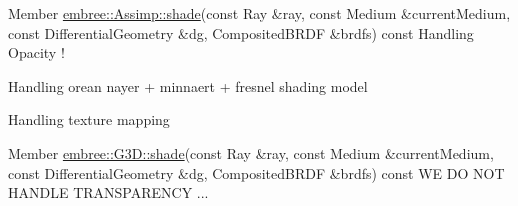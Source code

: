 \label{todo__todo000001}
\hypertarget{todo__todo000001}{}
 
\begin{DoxyDescription}
\item[Member \hyperlink{classembree_1_1_assimp_a41253494303759e35a284c5bdcb890a5}{embree::Assimp::shade}(const Ray \&ray, const Medium \&currentMedium, const DifferentialGeometry \&dg, CompositedBRDF \&brdfs) const  ]Handling Opacity ! 

Handling orean nayer + minnaert + fresnel shading model 

Handling texture mapping 
\end{DoxyDescription}

\label{todo__todo000002}
\hypertarget{todo__todo000002}{}
 
\begin{DoxyDescription}
\item[Member \hyperlink{classembree_1_1_g3_d_a03fd4021f086a07c713848a3d3d1bd97}{embree::G3D::shade}(const Ray \&ray, const Medium \&currentMedium, const DifferentialGeometry \&dg, CompositedBRDF \&brdfs) const  ]WE DO NOT HANDLE TRANSPARENCY ... 
\end{DoxyDescription}